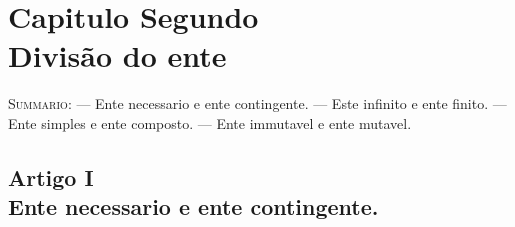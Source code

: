 \ifdefined\pg\else{}\fi


\chapter*{Capitulo Segundo\\[0.3em]\large Divisão do ente}

{\small\noindent\textsc{Summario}: --- Ente necessario e ente contingente. --- Este infinito
e ente finito. --- Ente simples e ente composto. --- Ente immutavel e ente mutavel.\par}

\section*{Artigo I\\ Ente necessario e ente contingente.}

